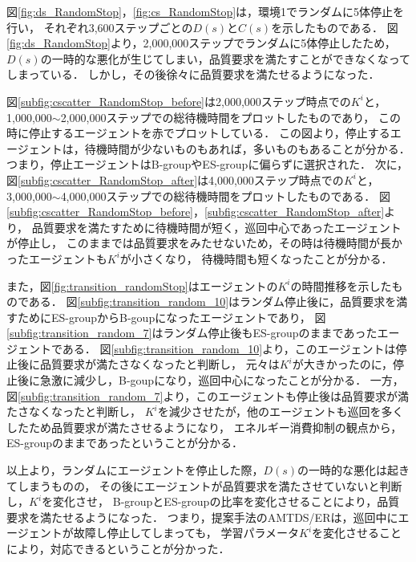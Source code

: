 \documentclass[12pt,a4j,twoside]{jarticle}
\begin{document}
  図\ref{fig:ds_RandomStop}，\ref{fig:cs_RandomStop}は，環境1でランダムに5体停止を行い，
  それぞれ3,600ステップごとの$D(s)$と$C(s)$を示したものである．
  図\ref{fig:ds_RandomStop}より，2,000,000ステップでランダムに5体停止したため，
  $D(s)$の一時的な悪化が生じてしまい，品質要求を満たすことができなくなってしまっている．
  しかし，その後徐々に品質要求を満たせるようになった．
  \par

  図\ref{subfig:cscatter_RandomStop_before}は2,000,000ステップ時点での$K^i$と，
  1,000,000$\sim$2,000,000ステップでの総待機時間をプロットしたものであり，
  この時に停止するエージェントを赤でプロットしている．
  この図より，停止するエージェントは，待機時間が少ないものもあれば，多いものもあることが分かる．
  つまり，停止エージェントはB-groupやES-groupに偏らずに選択された．
  次に，図\ref{subfig:cscatter_RandomStop_after}は4,000,000ステップ時点での$K^i$と，
  3,000,000$\sim$4,000,000ステップでの総待機時間をプロットしたものである．
  図\ref{subfig:cscatter_RandomStop_before}，\ref{subfig:cscatter_RandomStop_after}より，
  品質要求を満たすために待機時間が短く，巡回中心であったエージェントが停止し，
  このままでは品質要求をみたせないため，その時は待機時間が長かったエージェントも$K^i$が小さくなり，
  待機時間も短くなったことが分かる．
  \par

  また，図\ref{fig:transition_randomStop}はエージェントの$K^i$の時間推移を示したものである．
  図\ref{subfig:transition_random_10}はランダム停止後に，品質要求を満すためにES-groupからB-goupになったエージェントであり，
  図\ref{subfig:transition_random_7}はランダム停止後もES-groupのままであったエージェントである．
  図\ref{subfig:transition_random_10}より，このエージェントは停止後に品質要求が満たさなくなったと判断し，
  元々は$K^i$が大きかったのに，停止後に急激に減少し，B-goupになり，巡回中心になったことが分かる．
  一方，図\ref{subfig:transition_random_7}より，このエージェントも停止後は品質要求が満たさなくなったと判断し，
  $K^i$を減少させたが，他のエージェントも巡回を多くしたため品質要求が満たさせるようになり，
  エネルギー消費抑制の観点から，ES-groupのままであったということが分かる．
  \par

  以上より，ランダムにエージェントを停止した際，$D(s)$の一時的な悪化は起きてしまうものの，
  その後にエージェントが品質要求を満たさせていないと判断し，$K^i$を変化させ，
  B-groupとES-groupの比率を変化させることにより，品質要求を満たせるようになった．
  つまり，提案手法のAMTDS/ERは，巡回中にエージェントが故障し停止してしまっても，
  学習パラメータ$K^i$を変化させることにより，対応できるということが分かった．
  \par
  
\end{document}
